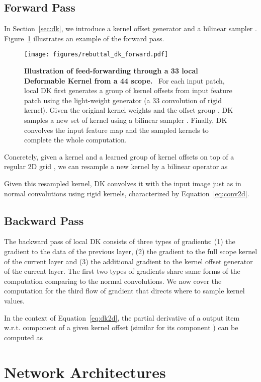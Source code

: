 \documentclass{article} \usepackage{iclr2020_conference, times}
\newcommand{\captiont}[2]{\caption{\textbf{#1} #2}}
\begin{document}
\subsection{Forward Pass}
In Section~\ref{sec:dk}, we introduce a kernel offset
generator  and a bilinear sampler .
Figure~\ref{fig:local-dk} illustrates an example of the forward pass.
\begin{figure}[t]
    \centering
    \texttt{[image: figures/rebuttal\_dk\_forward.pdf]}
    \captiont{
            Illustration of feed-forwarding through a 33 local
            Deformable Kernel from a 44 scope.
        }{\
        For each input patch, local DK first generates a group of kernel
        offsets  from input feature patch using the light-weight
        generator  (a 33 convolution of rigid kernel).
        Given the original kernel weights  and the offset group , DK
        samples a new set of kernel  using a bilinear sampler .
        Finally, DK convolves the input feature map and the sampled kernels to complete the
        whole computation.
    }\vspace{-0.5em}
    \label{fig:local-dk}
\end{figure}

Concretely, given a kernel  and a learned group of kernel offsets  on
top of a regular 2D grid , we can resample a new kernel  by
a bilinear operator  as

Given this resampled kernel, DK convolves it with the input image just as in normal
convolutions using rigid kernels, characterized by Equation~\ref{eq:conv2d}.

\subsection{Backward Pass}
The backward pass of local DK consists of three types of gradients: (1)
the gradient to the data of the previous layer, (2) the gradient to the full scope
kernel of the current layer and (3) the additional gradient to the kernel
offset generator of the current layer.
The first two types of gradients share same forms of the computation comparing
to the normal convolutions.
We now cover the computation for the third flow of gradient that directs where
to sample kernel values.

In the context of Equation~\ref{eq:dk2d}, the partial derivative of a output
item  w.r.t.   component of a given kernel offset  (similar for its  component ) can be computed as


\section{Network Architectures}
\end{document}
